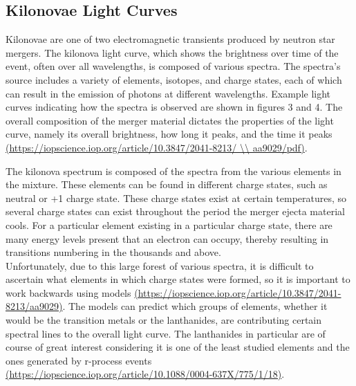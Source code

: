 \documentclass[11pt,a4paper]{article}
\begin{document}
\subsection{Kilonovae Light Curves}

Kilonovae are one of two electromagnetic transients produced by neutron star mergers. The kilonova light curve, which shows the brightness over time of the event, often over all wavelengths, is composed of various spectra. The spectra's source includes a variety of elements, isotopes, and charge states, each of which can result in the emission of photons at different wavelengths. Example light curves indicating how the spectra is observed are shown in figures 3 and 4. The overall composition of the merger material dictates the properties of the light curve, namely its overall brightness, how long it peaks, and the time it peaks \url{(https://iopscience.iop.org/article/10.3847/2041-8213/ \\ aa9029/pdf)}.

The kilonova spectrum is composed of the spectra from the various elements in the mixture. These elements can be found in different charge states, such as neutral or +1 charge state. These charge states exist at certain temperatures, so several charge states can exist throughout the period the merger ejecta material cools. For a particular element existing in a particular charge state, there are many energy levels present that an electron can occupy, thereby resulting in transitions numbering in the thousands and above.\\

Unfortunately, due to this large forest of various spectra, it is difficult to ascertain what elements in which charge states were formed, so it is important to work backwards using models  \url{(https://iopscience.iop.org/article/10.3847/2041-8213/aa9029)}. The models can predict which groups of elements, whether it would be the transition metals or the lanthanides, are contributing certain spectral lines to the overall light curve. The lanthanides in particular are of course of great interest considering it is one of the least studied elements and the ones generated by r-process events \url{(https://iopscience.iop.org/article/10.1088/0004-637X/775/1/18)}.
\end{document}
